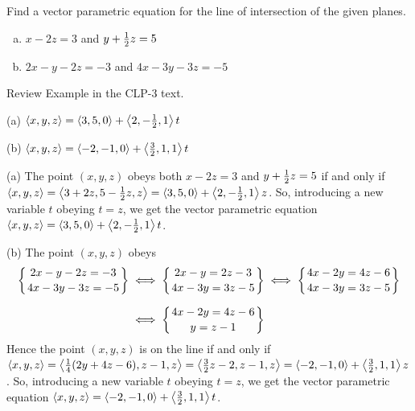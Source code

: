 
\subsection*{\Procedural}

\begin{question}
Find a vector parametric equation for the line of intersection
of the given planes.
\begin{enumerate}[(a)]
\item $x-2z=3$ and $y+\tfrac{1}{2} z=5$
\item $2x-y-2z=-3$ and $4x-3y-3 z=-5$
\end{enumerate}
\end{question}

\begin{hint}
Review Example  in the CLP-3 text.
\end{hint}

\begin{answer}
(a) $\left< x,y,z\right> =  \left< 3,5,0\right>+\left< 2,-\tfrac{1}{2},1\right> t$

(b) $\left< x,y,z\right> =  \left< -2,-1,0\right> +\left< \frac{3}{2},1,1\right> t$
\end{answer}

\begin{solution}
(a) The point $(x,y,z)$ obeys both $x-2z=3$ and $y+\tfrac{1}{2} z=5$
if and only if $\left< x,y,z\right> = \left< 3+2z, 5-\tfrac{1}{2} z, z\right> 
                  = \left< 3,5,0\right>+\left< 2,-\tfrac{1}{2},1\right> z$.
So, introducing a new variable $t$ obeying $t=z$, we get the vector 
parametric equation $\left< x,y,z\right> =  \left< 3,5,0\right>+\left< 2,-\tfrac{1}{2},1\right> t$.

(b) The point $(x,y,z)$ obeys 
\begin{align*}
\left\{\Atop{2x-y-2z=-3}{4x-3y-3 z=-5} \right\}
&\iff \left\{\Atop{2x-y=2z-3}{4x-3y=3 z-5} \right\}
\iff\left\{\Atop{4x-2y=4z-6}{4x-3y=3 z-5} \right\}\\
\noalign{\vskip0.1in}
&\iff\left\{\Atop{4x-2y=4z-6}{y=z-1} \right\}
\end{align*}
Hence the point $(x,y,z)$ is on the line if and only if 
$\left< x,y,z\right> = \left< \frac{1}{4}(2y+4z-6), z-1, z\right>=
\left< \frac{3}{2}z-2, z-1, z\right> = \left< -2,-1,0\right>+\left< \frac{3}{2},1,1\right> z$.
So, introducing a new variable $t$ obeying $t=z$, we get the vector 
parametric equation $\left< x,y,z\right> =  \left< -2,-1,0\right>
        +\left< \frac{3}{2},1,1\right> t$.
\end{solution}

